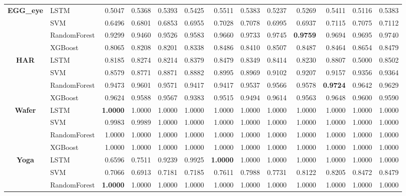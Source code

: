 \begin{table}[h]
\begin{adjustbox}{max width=15cm}
\begin{tabular}{|c|l|r|r|r|r|r|r|r|r|r|r|r|}
		\hline
		\textbf{EGG\_eye} & LSTM &  0.5047 &  0.5368 &  0.5393 &  0.5425 &  0.5511 &  0.5383 &  0.5237 &  0.5269 &  0.5411 &  0.5116 &  0.5383 \\
		& SVM &  0.6496 &  0.6801 &  0.6853 &  0.6955 &  0.7028 &  0.7078 &  0.6995 &  0.6937 &  0.7115 &  0.7075 &  0.7112 \\
		& RandomForest &  0.9299 &  0.9460 &  0.9526 &  0.9583 &  0.9660 &  0.9733 &  0.9745 &  \textbf{0.9759} &  0.9694 &  0.9695 &  0.9740 \\
		& XGBoost &  0.8065 &  0.8208 &  0.8201 &  0.8338 &  0.8486 &  0.8410 &  0.8507 &  0.8487 &  0.8464 &  0.8654 &  0.8479 \\
		\hline
		\textbf{HAR} & LSTM &  0.8185 &  0.8274 &  0.8214 &  0.8379 &  0.8479 &  0.8349 &  0.8414 &  0.8230 &  0.8807 &  0.5000 &  0.8502 \\
		& SVM &  0.8579 &  0.8771 &  0.8871 &  0.8882 &  0.8995 &  0.8969 &  0.9102 &  0.9207 &  0.9157 &  0.9356 &  0.9364 \\
		& RandomForest &  0.9473 &  0.9601 &  0.9571 &  0.9417 &  0.9417 &  0.9537 &  0.9566 &  0.9578 &  \textbf{0.9724} &  0.9642 &  0.9629 \\
		& XGBoost &  0.9624 &  0.9588 &  0.9567 &  0.9383 &  0.9515 &  0.9494 &  0.9614 &  0.9563 &  0.9648 &  0.9600 &  0.9590 \\
		\hline
		\textbf{Wafer} & LSTM &  \textbf{1.0000} &  1.0000 &  1.0000 &  1.0000 &  1.0000 &  1.0000 &  1.0000 &  1.0000 &  1.0000 &  1.0000 &  1.0000 \\
		& SVM &  0.9983 &  0.9989 &  1.0000 &  1.0000 &  1.0000 &  1.0000 &  1.0000 &  1.0000 &  1.0000 &  1.0000 &  1.0000 \\
		& RandomForest &  1.0000 &  1.0000 &  1.0000 &  1.0000 &  1.0000 &  1.0000 &  1.0000 &  1.0000 &  1.0000 &  1.0000 &  1.0000 \\
		& XGBoost &  1.0000 &  1.0000 &  1.0000 &  1.0000 &  1.0000 &  1.0000 &  1.0000 &  1.0000 &  1.0000 &  1.0000 &  1.0000 \\
		\hline
		\textbf{Yoga} & LSTM &  0.6596 &  0.7511 &  0.9239 &  0.9925 &  \textbf{1.0000} &  1.0000 &  1.0000 &  1.0000 &  1.0000 &  1.0000 &  1.0000 \\
		& SVM &  0.7066 &  0.6913 &  0.7181 &  0.7185 &  0.7611 &  0.7988 &  0.7731 &  0.8122 &  0.8205 &  0.8472 &  0.8479 \\
		& RandomForest &  \textbf{1.0000} &  1.0000 &  1.0000 &  1.0000 &  1.0000 &  1.0000 &  1.0000 &  1.0000 &  1.0000 &  1.0000 &  1.0000 \\

\end{tabular}
\end{adjustbox}
\end{table}
